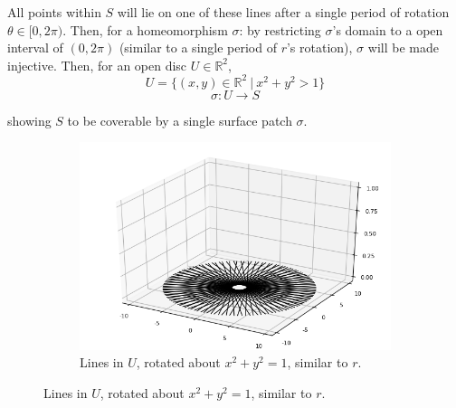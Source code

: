 \documentclass[12pt]{article}
\begin{document}
  \indent
  All points within $S$ will lie on one of these lines after a single period of rotation \newline $\theta \in [0,2\pi)$. Then, for a homeomorphism $\sigma$: by restricting $\sigma$'s domain to a open interval of $(0,2\pi)$ (similar to a single period of $r$'s rotation), $\sigma$ will be made injective. Then, for an open disc $U \in \mathbb{R}^2$,
   $$
  U = \lbrace (x,y) \in \mathbb{R}^2  \ \vert \ x^2 + y^2 > 1\rbrace 
  $$
  $$
  \sigma : U \rightarrow S
  $$

showing $S$ to be coverable by a single surface patch $\sigma$.

\begin{figure}[h!]
  \centering
      \begin{subfigure}[b]{0.6\linewidth}
    \includegraphics[width=\linewidth]{./assets/4-1-3/hyperboloid-line-rotation-planar.png}
    \caption*{Lines in $U$, rotated about $x^2+y^2=1$, similar to $r$.}
  \end{subfigure}
  \end{figure}


\clearpage
\end{document}
